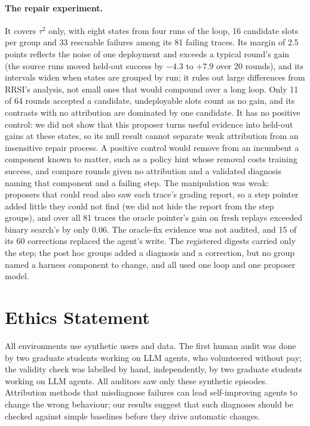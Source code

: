 \documentclass[11pt]{article}
\begin{document}
\paragraph{The repair experiment.} It covers $\tau^2$ only, with eight states from four runs of the loop, 16 candidate slots per group and 33 rescuable failures among its 81 failing traces. Its margin of 2.5 points reflects the noise of one deployment and exceeds a typical round's gain (the source runs moved held-out success by $-4.3$ to $+7.9$ over 20 rounds), and its intervals widen when states are grouped by run; it rules out large differences from RRSI's analysis, not small ones that would compound over a long loop. Only 11 of 64 rounds accepted a candidate, undeployable slots count as no gain, and its contrasts with no attribution are dominated by one candidate. It has no positive control: we did not show that this proposer turns useful evidence into held-out gains at these states, so its null result cannot separate weak attribution from an insensitive repair process. A positive control would remove from an incumbent a component known to matter, such as a policy hint whose removal costs training success, and compare rounds given no attribution and a validated diagnosis naming that component and a failing step. The manipulation was weak: proposers that could read also saw each trace's grading report, so a step pointer added little they could not find (we did not hide the report from the step groups), and over all 81 traces the oracle pointer's gain on fresh replays exceeded binary search's by only 0.06. The oracle-fix evidence was not audited, and 15 of its 60 corrections replaced the agent's write. The registered digests carried only the step; the post hoc groups added a diagnosis and a correction, but no group named a harness component to change, and all used one loop and one proposer model.

\section*{Ethics Statement}
All environments use synthetic users and data. The first human audit was done by two graduate students working on LLM agents, who volunteered without pay; the validity check was labelled by hand, independently, by two graduate students working on LLM agents. All auditors saw only these synthetic episodes. Attribution methods that misdiagnose failures can lead self-improving agents to change the wrong behaviour; our results suggest that such diagnoses should be checked against simple baselines before they drive automatic changes.
\end{document}
